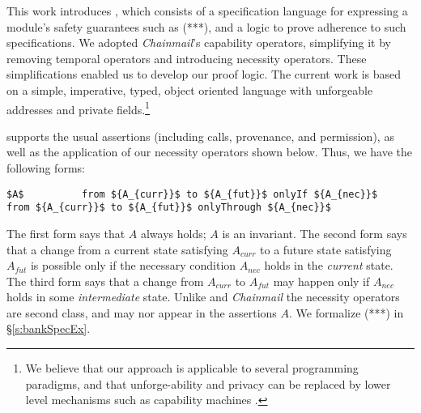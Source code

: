 This work introduces \Nec, which consists of a specification language for expressing a module's safety guarantees such as (***), and a logic 
to prove adherence to such specifications.
We adopted %
\emph{Chainmail}'s %
  capability operators, simplifying it by removing temporal operators and introducing necessity operators. These simplifications enabled us to develop our proof logic. 
The current work is based on a simple, imperative, typed, object oriented
language with unforgeable addresses and private fields.\footnote{We believe
 that our approach is applicable to several programming paradigms, and 
 that   unforge-ability and privacy
 can be replaced 
 by lower level mechanisms such as capability machines \cite{vanproving,davis2019cheriabi}.
  }


 

\Nec supports the usual assertions (including calls, provenance,
and permission), as well as the application of our necessity operators shown below.
Thus, we  have %
 the following forms:
\begin{lstlisting}[mathescape=true, language=chainmail, frame=lines]
       $A$          from ${A_{curr}}$ to ${A_{fut}}$ onlyIf ${A_{nec}}$          from ${A_{curr}}$ to ${A_{fut}}$ onlyThrough ${A_{nec}}$
\end{lstlisting}
%
The first form says that $A$ always holds;  $A$ is an invariant.
The second form says that  a change from a current state satisfying $A_{curr}$ to a future
state satisfying $A_{fut}$ %
is possible only if the necessary condition
$A_{nec}$ holds in the \emph{current} state.
The third form says that a change from %
$A_{curr}$ to %
$A_{fut}$  may happen only if %
$A_{nec}$ holds in some \emph{intermediate} state.
Unlike  {} and  \emph{Chainmail} 
 the necessity operators %
 are second class, and may nor appear in the assertions $A$.
We formalize (***) %
in  \S\ref{s:bankSpecEx}.


